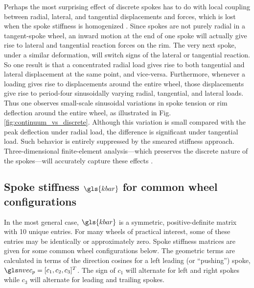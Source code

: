 \documentclass[\rootdir/thesis.tex]{subfiles}
\begin{document}
Perhaps the most surprising effect of discrete spokes has to do with local coupling between radial, lateral, and tangential displacements and forces, which is lost when the spoke stiffness is homogenized \cite{PapadopoulosPriv}. Since spokes are not purely radial in a tangent-spoke wheel, an inward motion at the end of one spoke will actually give rise to lateral and tangential reaction forces on the rim. The very next spoke, under a similar deformation, will switch signs of the lateral or tangential reaction. So one result is that a concentrated radial load gives rise to both tangential and lateral displacement at the same point, and vice-versa. Furthermore, whenever a loading gives rise to displacements around the entire wheel, those displacements give rise to period-four sinusoidally varying radial, tangential, and lateral loads. Thus one observes small-scale sinusoidal variations in spoke tension or rim deflection around the entire wheel, as illustrated in Fig. \ref{fig:continuum_vs_discrete}. Although this variation is small compared with the peak deflection under radial load, the difference is significant under tangential load. Such behavior is entirely suppressed by the smeared stiffness approach. Three-dimensional finite-element analysis---which preserves the discrete nature of the spokes---will accurately capture these effects \cite{Salamon1992}.

\subsection{Spoke stiffness $\gls{kbar}$ for common wheel configurations}

In the most general case, $\gls{kbar}$ is a symmetric, positive-definite matrix with 10 unique entries. For many wheels of practical interest, some of these entries may be identically or approximately zero. Spoke stiffness matrices are given for some common wheel configurations below. The geometric terms are calculated in terms of the direction cosines for a left leading (or ``pushing'') spoke, $\n_p = [c_1, c_2, c_3]^T$. The sign of $c_1$ will alternate for left and right spokes while $c_3$ will alternate for leading and trailing spokes.
\end{document}
